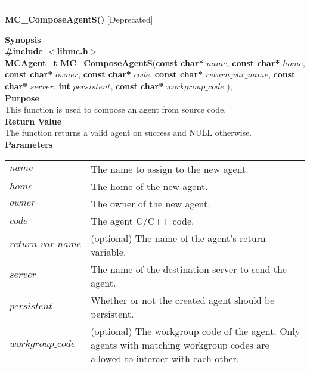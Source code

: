 \noindent
\vspace{5pt}
\rule{6.5in}{0.015in}
\noindent
{}
{\LARGE \bf MC\_ComposeAgentS()} [Deprecated]\\

\noindent
{\bf Synopsis}\\
{\bf \#include $<$libmc.h$>$}\\
{\bf MCAgent\_t MC\_ComposeAgentS}({\bf const char*} $name$, 
                                  {\bf const char*} $home$,
                                  {\bf const char*} $owner$,
                                  {\bf const char*} $code$,
                                  {\bf const char*} $return\_var\_name$,
                                  {\bf const char*} $server$,
                                  {\bf int} $persistent$,
                                  {\bf const char*} $workgroup\_code$
																	);\\

\noindent
{\bf Purpose}\\
This function is used to compose an agent from source code.\\

\noindent
{\bf Return Value}\\
The function returns a valid agent on success and NULL otherwise.\\

\noindent
{\bf Parameters}
\vspace{-0.1in}
\begin{description}
\item
\begin{tabular}{p{30 mm}p{125 mm}} 
$name$ & The name to assign to the new agent.\\
$home$ & The home of the new agent.\\
$owner$ & The owner of the new agent.\\
$code$ & The agent C/C++ code.\\
$return\_var\_name$ & (optional) The name of the agent's return variable.\\
$server$ & The name of the destination server to send the agent.\\
$persistent$ & Whether or not the created agent should be persistent.\\
$workgroup\_code$ & (optional) The workgroup code of the agent. Only agents with matching workgroup codes are allowed to interact with each other.\\
\end{tabular}
\end{description}


